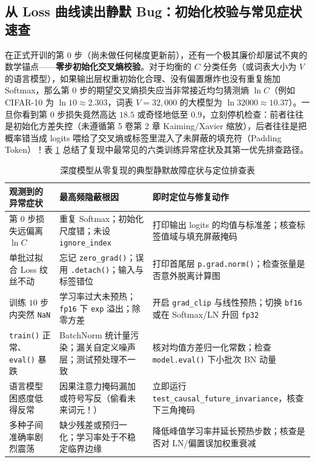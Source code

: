 \subsection{从 Loss 曲线读出静默 Bug：初始化校验与常见症状速查}

在正式开训的第 $0$ 步（尚未做任何梯度更新前），还有一个极其廉价却屡试不爽的数学锚点——\textbf{零步初始化交叉熵校验}。对于均衡的 $C$ 分类任务（或词表大小为 $V$ 的语言模型），如果输出层权重初始化合理、没有偏置爆炸也没有重复施加 Softmax，那么第 $0$ 步的期望交叉熵损失应当非常接近均匀猜测熵 $\ln C$（例如 CIFAR-10 为 $\ln 10 \approx 2.303$，词表 $V = 32{,}000$ 的大模型为 $\ln 32000 \approx 10.37$）。一旦你看到第 $0$ 步损失竟然高达 $18.5$ 或奇怪地低至 $0.9$，立刻停机检查：前者往往是初始化方差失控（未遵循第 5 卷第 2 章 Kaiming/Xavier 缩放），后者往往是把概率错当成 logits 喂给了交叉熵或标签里混入了未屏蔽的填充符（Padding Token）！表 \ref{tab:debug-symptoms} 总结了复现中最常见的六类训练异常症状及其第一优先排查路径。

\begin{table}[htbp]
  \centering
  \caption{深度模型从零复现的典型静默故障症状与定位排查表}
  \label{tab:debug-symptoms}
  \footnotesize
  \begin{tabularx}{\linewidth}{@{}p{34mm}p{50mm}X@{}}
    \toprule
    \textbf{观测到的异常症状} & \textbf{最高频隐蔽根因} & \textbf{即时定位与修复动作} \\
    \midrule
    第 $0$ 步损失远偏离 $\ln C$ & 重复 Softmax；初始化尺度错；未设 \texttt{ignore\_index} & 打印输出 logits 的均值与标准差；核查标签值域与填充屏蔽掩码 \\
    单批过拟合 Loss 纹丝不动 & 忘记 \texttt{zero\_grad()}；误用 \texttt{.detach()}；输入与标签错位 & 打印首尾层 \texttt{p.grad.norm()}；检查张量是否意外脱离计算图 \\
    训练 $10$ 步内突然 \texttt{NaN} & 学习率过大未预热；\texttt{fp16} 下 \texttt{exp} 溢出；除零方差 & 开启 \texttt{grad\_clip} 与线性预热；切换 \texttt{bf16} 或在 Softmax/LN 升回 \texttt{fp32} \\
    \texttt{train()} 正常、\texttt{eval()} 暴跌 & BatchNorm 统计量污染；漏关自定义噪声层；测试预处理不一致 & 核对均值方差归一化常数；检查 \texttt{model.eval()} 下小批次 BN 动量 \\
    语言模型困惑度低得反常 & 因果注意力掩码漏加或符号写反（偷看未来词元！） & 立即运行 \texttt{test\_causal\_\allowbreak future\_invariance}，核查下三角掩码 \\
    多种子间准确率剧烈震荡 & 缺少残差或预归一化；学习率处于不稳定临界边缘 & 降低峰值学习率并延长预热步数；核查是否对 LN/偏置误加权重衰减 \\
    \bottomrule
  \end{tabularx}
\end{table}

